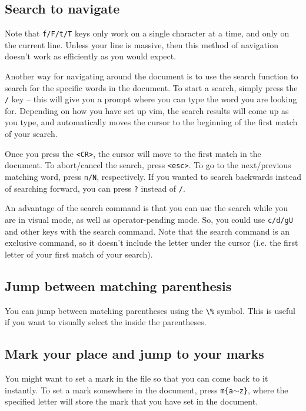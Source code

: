 \subsection{Search to navigate}

Note that \verb|f/F/t/T| keys only work on a single character at a time, and only on the current line.
Unless your line is massive, then this method of navigation doesn't work as efficiently as you would expect.

Another way for navigating around the document is to use the search function to search for the specific words in the document.
To start a search, simply press the \verb|/| key -- this will give you a prompt where you can type the word you are looking for.
Depending on how you have set up vim, the search results will come up as you type, and automatically moves the cursor to the beginning of the first match of your search.

Once you press the \verb|<CR>|, the cursor will move to the first match in the document.
To abort/cancel the search, press \verb|<esc>|.
To go to the next/previous matching word, press \verb|n/N|, respectively.
If you wanted to search backwards instead of searching forward, you can press \verb|?| instead of \verb|/|.

An advantage of the search command is that you can use the search while you are in visual mode, as well as operator-pending mode.
So, you could use \verb|c/d/gU| and other keys with the search command.
Note that the search command is an exclusive command, so it doesn't include the letter under the cursor (i.e. the first letter of your first match of your search).

\subsection{Jump between matching parenthesis}

You can jump between matching parentheses using the \verb|\%| symbol.
This is useful if you want to visually select the inside the parentheses.

\subsection{Mark your place and jump to your marks}

You might want to set a mark in the file so that you can come back to it instantly.
To set a mark somewhere in the document, press \verb|m{a|$\sim$\verb|z}|, where the specified letter will store the mark that you have set in the document.

